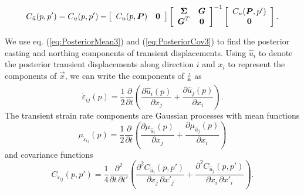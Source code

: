 \documentclass[extra,mreferee]{gji}
\newcommand*{\du}[1]{\uuline{#1}}
\begin{document}
\begin{equation}\label{eq:PosteriorCov3}
C_{\hat{u}}(p,p') = C_u(p,p') - 
                    \left[\begin{array}{cc}
                          C_u(p,\mitbf{P}) & \mitbf{0} \\
                          \end{array}\right]
                    \left[\begin{array}{cc}
                          \mitbf{\Sigma} & \mitbf{G} \\
                          \mitbf{G}^T  & \mitbf{0} \\
                          \end{array}\right]^{-1}
                    \left[\begin{array}{c}
                          C_u(\mitbf{P},p') \\
                          \mitbf{0} \\
                          \end{array}\right].
\end{equation}

We use eq. (\ref{eq:PosteriorMean3}) and (\ref{eq:PosteriorCov3}) to find the posterior easting and northing components of transient displacements. Using $\hat{u}_i$ to denote the posterior transient displacements along direction $i$ and $x_i$ to represent the components of $\vec{x}$, we can write the components of $\dot{\du{\varepsilon}}$ as 
\begin{equation}\label{eq:StrainRate}
\dot{\varepsilon}_{ij}(p) = \frac{1}{2} \frac{\partial}{\partial t} \left(
                                        \frac{\partial \hat{u}_i(p)}{\partial x_j} +  
                                        \frac{\partial \hat{u}_j(p)}{\partial x_i}\right).
\end{equation}
The transient strain rate components are Gaussian processes with mean functions
\begin{equation}\label{eq:StrainMean}
\mu_{\dot{\varepsilon}_{ij}}(p) = \frac{1}{2}\frac{\partial}{\partial t}\left(
                                  \frac{\partial \mu_{\hat{u}_i}(p)}{\partial x_j} + 
                                  \frac{\partial \mu_{\hat{u}_j}(p)}{\partial x_i} \right)
\end{equation} 
and covariance functions
\begin{equation}\label{eq:StrainCov}
C_{\dot{\varepsilon}_{ij}}(p,p') = \frac{1}{4} \frac{\partial^2}{\partial t \, \partial t'}\left(
                                   \frac{\partial^2 C_{\hat{u}_i}(p,p')}{\partial x_j \, \partial x'_j} + 
                                   \frac{\partial^2 C_{\hat{u}_j}(p,p')}{\partial x_i \, \partial x'_i} \right).
\end{equation} 
\end{document}

